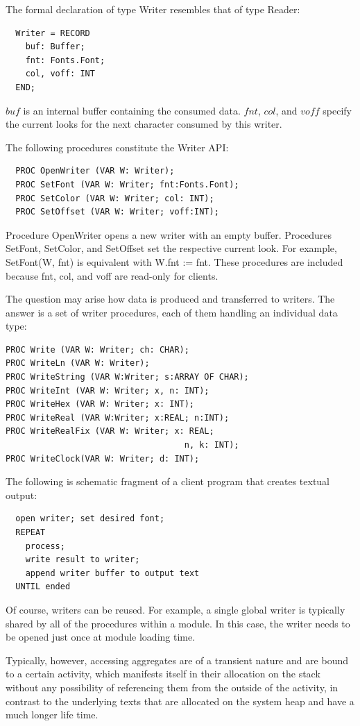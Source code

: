 The formal declaration of type Writer resembles that of type Reader:
\begin{verbatim}
  Writer = RECORD
    buf: Buffer;
    fnt: Fonts.Font;
    col, voff: INT
  END;
\end{verbatim}

$buf$ is an internal buffer containing the consumed data. $fnt$, $col$, and $voff$ specify the current looks for
the next character consumed by this writer.

The following procedures constitute the Writer API:
\begin{verbatim}
  PROC OpenWriter (VAR W: Writer);
  PROC SetFont (VAR W: Writer; fnt:Fonts.Font);
  PROC SetColor (VAR W: Writer; col: INT);
  PROC SetOffset (VAR W: Writer; voff:INT);
\end{verbatim}

Procedure OpenWriter opens a new writer with an empty buffer. Procedures SetFont, SetColor, and
SetOffset set the respective current look. For example, SetFont(W, fnt) is equivalent with W.fnt :=
fnt. These procedures are included because fnt, col, and voff are read-only for clients.

The question may arise how data is produced and transferred to writers. The answer is a set of
writer procedures, each of them handling an individual data type:
\begin{verbatim}
PROC Write (VAR W: Writer; ch: CHAR);
PROC WriteLn (VAR W: Writer);
PROC WriteString (VAR W:Writer; s:ARRAY OF CHAR);
PROC WriteInt (VAR W: Writer; x, n: INT);
PROC WriteHex (VAR W: Writer; x: INT);
PROC WriteReal (VAR W:Writer; x:REAL; n:INT);
PROC WriteRealFix (VAR W: Writer; x: REAL;
                                    n, k: INT);
PROC WriteClock(VAR W: Writer; d: INT);
\end{verbatim}

The following is schematic fragment of a client program that creates textual output:
\begin{verbatim}
  open writer; set desired font;
  REPEAT
    process;
    write result to writer;
    append writer buffer to output text
  UNTIL ended
\end{verbatim}
Of course, writers can be reused. For example, a single global writer is typically shared by all of the
procedures within a module. In this case, the writer needs to be opened just once at module loading
time.

Typically, however, accessing aggregates are of a transient nature and are bound to a certain
activity, which manifests itself in their allocation on the stack without any possibility of referencing
them from the outside of the activity, in contrast to the underlying texts that are allocated on the
system heap and have a much longer life time.

